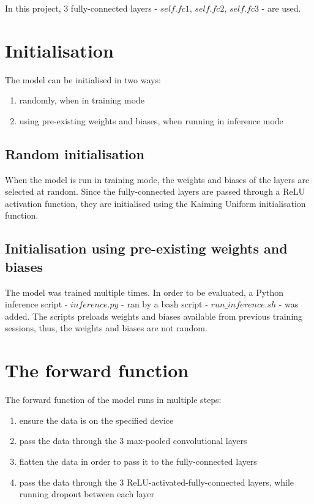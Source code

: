 \documentclass[conference]{IEEEtran}
\begin{document}
In this project, 3 fully-connected layers - $self.fc1$, $self.fc2$, $self.fc3$ - are used.

\section{Initialisation}
The model can be initialised in two ways:

\begin{enumerate}
    \item randomly, when in training mode
    \item using pre-existing weights and biases, when running in inference mode
\end{enumerate}

\subsection{Random initialisation}
When the model is run in training mode, the weights and biases of the layers are selected at random. Since the fully-connected
layers are passed through a ReLU activation function, they are initialised using the Kaiming Uniform initialisation function. 

\subsection{Initialisation using pre-existing weights and biases}
The model was trained multiple times. In order to be evaluated, a Python inference script - $inference.py$ - ran by a bash script
- $run\_inference.sh$ - was added. The scripts preloads weights and biases available from previous training sessions, thus,
the weights and biases are not random.

\section{The forward function}
The forward function of the model runs in multiple steps:

\begin{enumerate}
    \item ensure the data is on the specified device
    \item pass the data through the 3 max-pooled convolutional layers
    \item flatten the data in order to pass it to the fully-connected layers
    \item pass the data through the 3 ReLU-activated-fully-connected layers, while running dropout between each layer
\end{enumerate}
\end{document}
